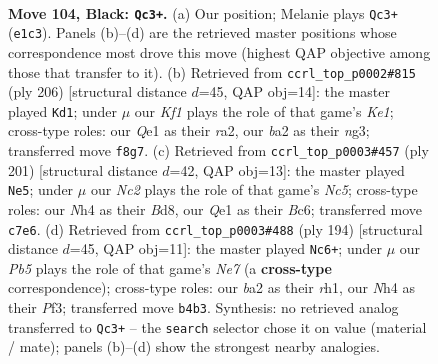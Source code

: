 \documentclass[11pt]{article}
\begin{document}
\clearpage

\begin{figure}[p]\centering
\begin{subfigure}{0.46\textwidth}\centering
\resizebox{\linewidth}{!}{%
\newchessgame
\chessboard[
  setfen={5k2/1Nn5/8/8/Pp2P2n/8/B1K2b1p/4q3 b - - 1 104},
  showmover=false,
  pgfstyle=straightmove, color=movearrow, markmove={e1-c3}
]}
\caption{}
\end{subfigure}\hfill
\begin{subfigure}{0.46\textwidth}\centering
\resizebox{\linewidth}{!}{%
\newchessgame
\chessboard[
  setfen={8/3B4/2R4p/6p1/P2k4/6nP/r7/4K3 w - - 11 104},
  showmover=false,
  pgfstyle=straightmove, color=movearrow, markmove={e1-d1}
]}
\caption{}
\end{subfigure}
\\[4pt]
\begin{subfigure}{0.46\textwidth}\centering
\resizebox{\linewidth}{!}{%
\newchessgame
\chessboard[
  setfen={3b4/5k2/2b2p2/2p5/P1n2NP1/8/2B1K3/B7 b - - 1 101},
  showmover=false,
  pgfstyle=straightmove, color=movearrow, markmove={c4-e5}
]}
\caption{}
\end{subfigure}\hfill
\begin{subfigure}{0.46\textwidth}\centering
\resizebox{\linewidth}{!}{%
\newchessgame
\chessboard[
  setfen={8/4N2p/8/4k1B1/5p1P/5P2/4K3/7r w - - 53 98},
  showmover=false,
  pgfstyle=straightmove, color=movearrow, markmove={e7-c6}
]}
\caption{}
\end{subfigure}
\caption{\textbf{Move 104, Black: \texttt{Qc3+}.} (a) Our position; Melanie plays \texttt{Qc3+} (\texttt{e1c3}). Panels (b)--(d) are the retrieved master positions whose correspondence most drove this move (highest QAP objective among those that transfer to it). (b) Retrieved from \texttt{ccrl\_top\_p0002\#815} (ply 206) [structural distance $d$=45, QAP obj=14]: the master played \texttt{Kd1}; under $\mu$ our \emph{Kf1} plays the role of that game's \emph{Ke1}; cross-type roles: our \emph{Q}e1 as their \emph{r}a2, our \emph{b}a2 as their \emph{n}g3; transferred move \texttt{f8g7}. (c) Retrieved from \texttt{ccrl\_top\_p0003\#457} (ply 201) [structural distance $d$=42, QAP obj=13]: the master played \texttt{Ne5}; under $\mu$ our \emph{Nc2} plays the role of that game's \emph{Nc5}; cross-type roles: our \emph{N}h4 as their \emph{B}d8, our \emph{Q}e1 as their \emph{B}c6; transferred move \texttt{c7e6}. (d) Retrieved from \texttt{ccrl\_top\_p0003\#488} (ply 194) [structural distance $d$=45, QAP obj=11]: the master played \texttt{Nc6+}; under $\mu$ our \emph{Pb5} plays the role of that game's \emph{Ne7} (a \textbf{cross-type} correspondence); cross-type roles: our \emph{b}a2 as their \emph{r}h1, our \emph{N}h4 as their \emph{P}f3; transferred move \texttt{b4b3}. Synthesis: no retrieved analog transferred to \texttt{Qc3+} -- the \texttt{search} selector chose it on value (material / mate); panels (b)--(d) show the strongest nearby analogies.}
\label{fig:thought-m207}
\end{figure}
\end{document}
